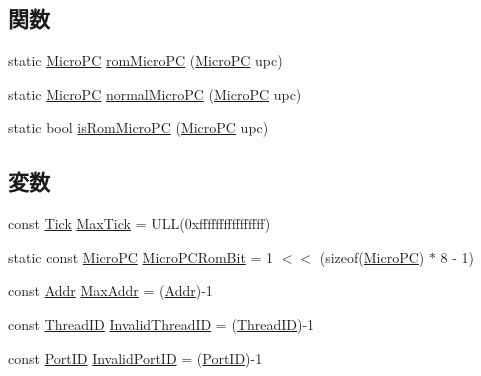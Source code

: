 \subsection*{関数}
\begin{DoxyCompactItemize}
\item 
static \hyperlink{base_2types_8hh_adfb4d8b20c5abc8be73dd367b16f2d57}{MicroPC} \hyperlink{base_2types_8hh_a5a785ae473dda4e3a3de2cb688f208d9}{romMicroPC} (\hyperlink{base_2types_8hh_adfb4d8b20c5abc8be73dd367b16f2d57}{MicroPC} upc)
\item 
static \hyperlink{base_2types_8hh_adfb4d8b20c5abc8be73dd367b16f2d57}{MicroPC} \hyperlink{base_2types_8hh_aef03c1e44f1929d58fb5ac37bfda39b9}{normalMicroPC} (\hyperlink{base_2types_8hh_adfb4d8b20c5abc8be73dd367b16f2d57}{MicroPC} upc)
\item 
static bool \hyperlink{base_2types_8hh_a01ec7071d9749218cc83949b3f93cd9b}{isRomMicroPC} (\hyperlink{base_2types_8hh_adfb4d8b20c5abc8be73dd367b16f2d57}{MicroPC} upc)
\end{DoxyCompactItemize}
\subsection*{変数}
\begin{DoxyCompactItemize}
\item 
const \hyperlink{base_2types_8hh_a5c8ed81b7d238c9083e1037ba6d61643}{Tick} \hyperlink{base_2types_8hh_abe940b1b328825e234da719447e15ca5}{MaxTick} = ULL(0xffffffffffffffff)
\item 
static const \hyperlink{base_2types_8hh_adfb4d8b20c5abc8be73dd367b16f2d57}{MicroPC} \hyperlink{base_2types_8hh_a1d50f14bd4d49816054d6a32c71e1ca3}{MicroPCRomBit} = 1 $<$$<$ (sizeof(\hyperlink{base_2types_8hh_adfb4d8b20c5abc8be73dd367b16f2d57}{MicroPC}) $\ast$ 8 -\/ 1)
\item 
const \hyperlink{base_2types_8hh_af1bb03d6a4ee096394a6749f0a169232}{Addr} \hyperlink{base_2types_8hh_a65da65e69ea5fb1119733a22d695b6f9}{MaxAddr} = (\hyperlink{base_2types_8hh_af1bb03d6a4ee096394a6749f0a169232}{Addr})-\/1
\item 
const \hyperlink{base_2types_8hh_ab39b1a4f9dad884694c7a74ed69e6a6b}{ThreadID} \hyperlink{base_2types_8hh_a192b210a26f038691d0f095d85dc0953}{InvalidThreadID} = (\hyperlink{base_2types_8hh_ab39b1a4f9dad884694c7a74ed69e6a6b}{ThreadID})-\/1
\item 
const \hyperlink{base_2types_8hh_acef4d7d41cb21fdc252e20c04cd7bb8e}{PortID} \hyperlink{base_2types_8hh_a65bf40f138cf863f0c5e2d8ca1144126}{InvalidPortID} = (\hyperlink{base_2types_8hh_acef4d7d41cb21fdc252e20c04cd7bb8e}{PortID})-\/1
\end{DoxyCompactItemize}


